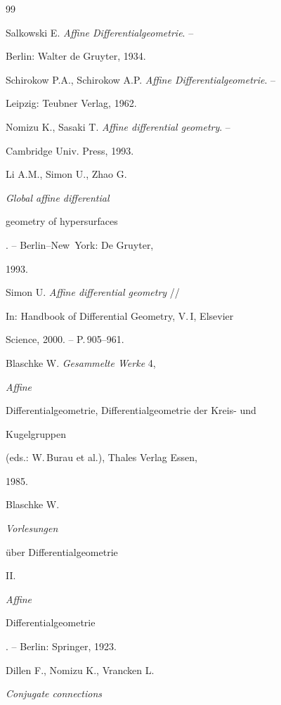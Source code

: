 \begin{thebibliography}{99}




Salkowski E. {\it Affine Differentialgeometrie}. --

Berlin: Walter de Gruyter, 1934.




Schirokow P.A., Schirokow A.P. {\it Affine Differentialgeometrie}. --

Leipzig: Teubner Verlag, 1962.




Nomizu K., Sasaki T. {\it Affine differential geometry}. --

Cambridge Univ. Press, 1993.




Li A.M., Simon U., Zhao G. {\it Global affine differential

geometry of hypersurfaces}. -- Berlin--New~York: De Gruyter, 

1993.




Simon U. {\it Affine differential geometry} //

In: Handbook of Differential Geometry, V.\,I, Elsevier

Science, 2000. -- P.\,905--961.




Blaschke W. {\it Gesammelte Werke} 4, {\it Affine

Differentialgeometrie, Differentialgeometrie der Kreis- und

Kugelgruppen} (eds.: W.\,Burau et al.), Thales Verlag Essen,

1985.




Blaschke W. {\it Vorlesungen

{\"u}ber Differentialgeometrie} II. {\it Affine

Differentialgeometrie}. -- Berlin: Springer, 1923.




Dillen F., Nomizu K., Vrancken L. {\it Conjugate connections

}
\end{thebibliography}
